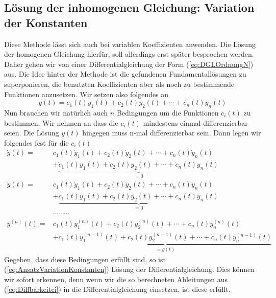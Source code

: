 \subsection{Lösung der inhomogenen Gleichung: Variation der Konstanten}
Diese Methode lässt sich auch bei variablen Koeffizienten anwenden. Die Lösung
der homogenen Gleichung hierfür, soll allerdings erst später besprochen werden.
Daher gehen wir von einer Differentialgleichung der Form (\ref{eq:DGLOrdnungN})
aus. Die Idee hinter der Methode ist die gefundenen Fundamentallösungen zu
superponieren, die benutzten Koeffizienten aber als noch zu bestimmende
Funktionen anzusetzen. Wir setzen also folgendes an
\begin{equation}
  y(t)=c_1(t)y_1(t)+c_2(t)y_2(t)+\cdots+c_n(t)y_n(t)
  \label{eq:AnsatzVariationKonstanten}
\end{equation}
Nun brauchen wir natürlich auch $n$ Bedingungen um die Funktionen $c_i(t)$ zu
bestimmen. Wir nehmen an dass die $c_i(t)$ mindestens einmal differenzierbar seien.
Die Lösung $y(t)$ hingegen muss n-mal differenzierbar sein. Dann legen wir folgendes fest für die $c_i(t)$
\begin{align}
  \dot{y}(t)=&c_1(t)\dot{y}_1(t)+c_2(t)\dot{y}_2(t)+\cdots+c_n(t)\dot{y}_n(t)\nonumber\\
  &+\underbrace{\dot{c}_1(t)y_1(t)+\dot{c}_2(t)y_2(t)+\cdots+\dot{c}_n(t)y_n(t)}_{=0}\nonumber\\
  \ddot{y}(t)=&c_1(t)\ddot{y}_1(t)+c_2(t)\ddot{y}_2(t)+\cdots+c_n(t)\ddot{y}_n(t)\nonumber\\
  &+\underbrace{\dot{c}_1(t)\dot{y}_1(t)+\dot{c}_2(t)\dot{y}_2(t)+\cdots
               +\dot{c}_n(t)\dot{y}_n(t)}_{=0}\nonumber\\
	       &\cdots\cdots\cdots\nonumber\\
	       y^{(n)}(t)=&c_1(t)y^{(n)}_1(t)+c_2(t)y^{(n)}_2(t)+\cdots+c_n(t)y^{(n)}_n(t)\nonumber\\
  &+\underbrace{\dot{c}_1(t)y^{(n-1)}_1(t)+\dot{c}_2(t)y^{(n-1)}_2(t)+\cdots
  +\dot{c}_n(t)y^{(n-1)}_n(t)}_{=g(t)}\label{eq:Diffbarkeitci}
\end{align}
Gegeben, dass diese Bedingungen erfüllt sind, so ist
(\ref{eq:AnsatzVariationKonstanten}) Lösung der Differentialgleichung. Dies
können wir sofort erkennen, denn wenn wir die so berechneten Ableitungen aus
(\ref{eq:Diffbarkeitci}) in die Differentialgleichung einsetzen, ist diese
erfüllt.


